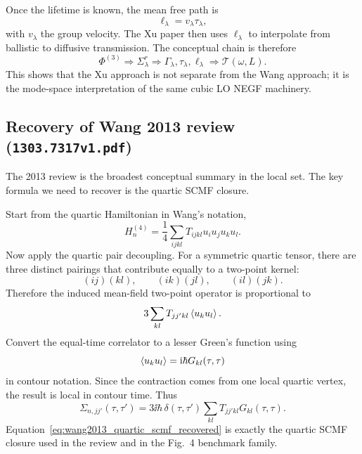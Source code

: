 Once the lifetime is known, the mean free path is
\begin{equation}
    \ell_\lambda = v_\lambda \tau_\lambda,
    \label{eq:xu_mean_free_path_recovered}
\end{equation}
with $v_\lambda$ the group velocity. The Xu paper then uses $\ell_\lambda$ to interpolate from ballistic to diffusive transmission. The conceptual chain is therefore
\begin{equation}
    \Phi^{(3)}
    \Rightarrow
    \Sigma_\lambda^r
    \Rightarrow
    \Gamma_\lambda,\tau_\lambda,\ell_\lambda
    \Rightarrow
    \mathcal T(\omega,L).
\end{equation}
This shows that the Xu approach is not separate from the Wang approach; it is the mode-space interpretation of the same cubic LO NEGF machinery.

\subsection{Recovery of Wang 2013 review (\texttt{1303.7317v1.pdf})}
The 2013 review is the broadest conceptual summary in the local set. The key formula we need to recover is the quartic SCMF closure.

Start from the quartic Hamiltonian in Wang's notation,
\begin{equation}
    H_n^{(4)} = \frac{1}{4}\sum_{ijkl}T_{ijkl}u_i u_j u_k u_l.
    \label{eq:wang2013_quartic_start}
\end{equation}
Now apply the quartic pair decoupling. For a symmetric quartic tensor, there are three distinct pairings that contribute equally to a two-point kernel:
\begin{equation}
    (ij)(kl),
    \qquad
    (ik)(jl),
    \qquad
    (il)(jk).
\end{equation}
Therefore the induced mean-field two-point operator is proportional to
\begin{equation}
    3\sum_{kl}T_{jj'kl}\left\langle u_k u_l \right\rangle.
\end{equation}
Convert the equal-time correlator to a lesser Green's function using
\begin{equation}
    \left\langle u_k u_l \right\rangle = \mathrm{i}\hbar G_{kl}(\tau,\tau)
\end{equation}
in contour notation. Since the contraction comes from one local quartic vertex, the result is local in contour time. Thus
\begin{equation}
    \Sigma_{n,jj'}(\tau,\tau') = 3\ii\hbar\,\delta(\tau,\tau')\sum_{kl}T_{jj'kl}G_{kl}(\tau,\tau).
    \label{eq:wang2013_quartic_scmf_recovered}
\end{equation}
Equation~\eqref{eq:wang2013_quartic_scmf_recovered} is exactly the quartic SCMF closure used in the review and in the Fig.~4 benchmark family.

